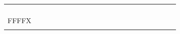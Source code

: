 \documentclass[aspectratio=169, xcolor=table, notheorems, hyperref={pdfpagelabels=false}]{beamer}
\begin{document}
\begin{frame}
\begin{minipage}[t]{120mm}
{\begin{tabular}{| c | c | c | c | c | c | c | c | c | c | c | c | c | c | c | c | c | c | c | c | c |}
                &   &   &   &   &   &   &   &   &   &   &   &   &   &   &   &     \\
\hline
                &   &   &   &   &   &   &   &   &   &   &   &   &   &   &   &     \\
                &   &   &   &   &   &   &   &   &   &   &   &   &   &   &   &     \\
                &   &   &   &   &   &   &   &   &   &   &   &   &   &   &   &     \\
\hline
                &   &   &   &   &   &   &   &   &   &   &   &   &   &   &   &     \\
         FFFFX  &   &   &   &   &   &   &   &   &   &   &   &   &   &   &   &     \\
                &   &   &   &   &   &   &   &   &   &   &   &   &   &   &   &     \\
\hline
\end{tabular}}
\end{minipage}
\\[2mm]
\end{frame}

\end{document}
